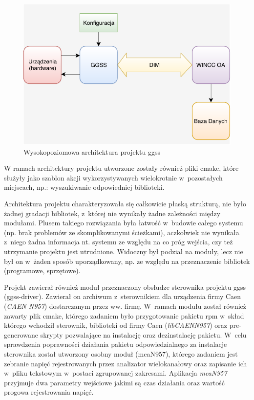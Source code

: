 \begin{figure}[H]
\centering
\includegraphics[width=\textwidth]{res/highLevelArch}
\caption{Wysokopoziomowa architektura projektu \gls*{ggss}}
\label{fig:highLevelArch}
\end{figure}

W ramach architektury projektu utworzone zostały również pliki \gls*{cmake}, które służyły jako szablon akcji wykorzystywanych wielokrotnie w~pozostałych miejscach, np.: wyszukiwanie odpowiedniej biblioteki.\par 
Architektura projektu charakteryzowała się całkowicie płaską strukturą, nie było żadnej gradacji bibliotek, z~której nie wynikały żadne zależności między modułami. Plusem takiego rozwiązania była łatwość w~budowie całego systemu (np. brak problemów ze skomplikowanymi ścieżkami), aczkolwiek nie wynikała z~niego żadna informacja nt. systemu ze względu na co próg wejścia, czy też utrzymanie projektu jest utrudnione. Widoczny był podział na moduły, lecz nie był on w~żaden sposób uporządkowany, np. ze względu na przeznaczenie bibliotek (programowe, sprzętowe). 

\par Projekt zawierał również moduł przeznaczony obsłudze sterownika projektu \gls*{ggss} (ggss-driver). Zawierał on archiwum z~sterownikiem dla urządzenia firmy Caen (\textit{CAEN N957}) dostarczanym przez ww. firmę. W~ramach modułu został również zawarty plik \gls*{cmake}, którego zadaniem było przygotowanie pakietu \gls*{rpm} w~skład którego wchodził sterownik, biblioteki od firmy Caen (\textit{libCAENN957}) oraz pre-generowane skrypty pozwalające na instalację oraz dezinstalację pakietu. W~celu sprawdzenia poprawności działania pakietu odpowiedzialnego za instalacje sterownika został utworzony osobny moduł (mcaN957), którego zadaniem jest zebranie napięć rejestrowanych przez analizator wielokanałowy oraz zapisanie ich w~pliku tekstowym w~postaci zgrupowanej zakresami. Aplikacja \textit{mcaN957} przyjmuje dwa parametry wejściowe jakimi są czas działania oraz wartość progowa rejestrowania napięć.


